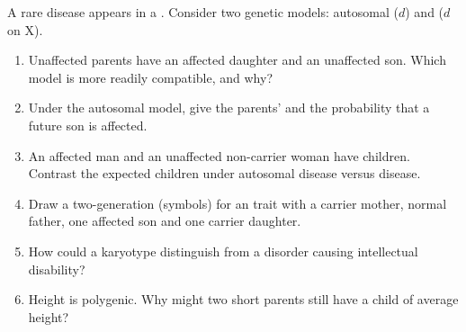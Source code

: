 \begin{problem}\label{pb:g11:human-genetics:1}
A rare disease appears in a . Consider two genetic models: autosomal
 ($d$) and   ($d$ on X).
\begin{enumerate}
  \item Unaffected parents have an affected daughter and an unaffected son.
        Which model is more readily compatible, and why?
  \item Under the autosomal  model, give the parents'  and the
        probability that a future son is affected.
  \item An affected man and an unaffected non-carrier woman have children.
        Contrast the expected children under autosomal  disease versus
          disease.
  \item Draw a two-generation  (symbols) for an   trait
        with a carrier mother, normal father, one affected son and one carrier
        daughter.
  \item How could a karyotype distinguish  from a  disorder
        causing intellectual disability?
  \item Height is polygenic. Why might two short parents still have a child of
        average height?
\end{enumerate}
\end{problem}
